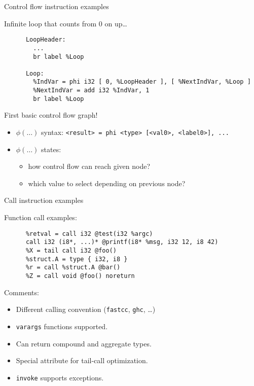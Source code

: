 \documentclass[8pt]{beamer}
\begin{document}
\begin{frame}[fragile]{Control flow instruction examples}
  \begin{exampleblock}{Infinite loop that counts from 0 on up\ldots}
    \begin{verbatim}
      LoopHeader:
        ...
        br label %Loop

      Loop:
        %IndVar = phi i32 [ 0, %LoopHeader ], [ %NextIndVar, %Loop ]
        %NextIndVar = add i32 %IndVar, 1
        br label %Loop
    \end{verbatim}
  \end{exampleblock}

  \begin{block}{First basic control flow graph!}
    \begin{itemize}
      \item $\phi(\ldots)$ syntax: \verb+<result> = phi <type> [<val0>, <label0>], ...+
      \item $\phi(\ldots)$ states:
        \begin{itemize}
          \item how control flow can reach given node?
          \item which value to select depending on previous node?
        \end{itemize}
    \end{itemize}
  \end{block}
\end{frame}

\begin{frame}[fragile]{Call instruction examples}
  \begin{exampleblock}{Function call examples:}
    \begin{verbatim}
      %retval = call i32 @test(i32 %argc)
      call i32 (i8*, ...)* @printf(i8* %msg, i32 12, i8 42)
      %X = tail call i32 @foo()
      %struct.A = type { i32, i8 }
      %r = call %struct.A @bar()
      %Z = call void @foo() noreturn
    \end{verbatim}
  \end{exampleblock}

  \begin{block}{Comments:}
    \begin{itemize}
      \item Different calling convention (\verb+fastcc+, \verb+ghc+, \ldots)
      \item \verb+varargs+ functions supported.
      \item Can return compound and aggregate types.
      \item Special attribute for tail-call optimization.
      \item \verb+invoke+ supports exceptions.
    \end{itemize}
  \end{block}
\end{frame}
\end{document}
